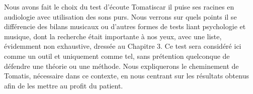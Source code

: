  
 

 
  Nous  avons fait le choix du test d'écoute Tomatis\textsuperscript \textregistered  car il 
 puise ses racines  en 
 audiologie avec utilisation des sons purs.
 Nous verrons sur quels points il se différencie des bilans musicaux 
 ou 
 d'autres formes de tests liant psychologie et musique, dont la recherche était importante à nos yeux, 
 avec une liste, 
 évidemment non exhaustive, dressée au Chapitre 3. 
  Ce test sera considéré ici 
 comme un outil et uniquement comme tel, sans prétention quelconque de défendre une théorie ou une 
 méthode. Nous expliquerons le cheminement de Tomatis, nécessaire dans ce contexte, en  nous 
 centrant sur les 
 résultats obtenus afin de les mettre 
 au profit du patient.
 

